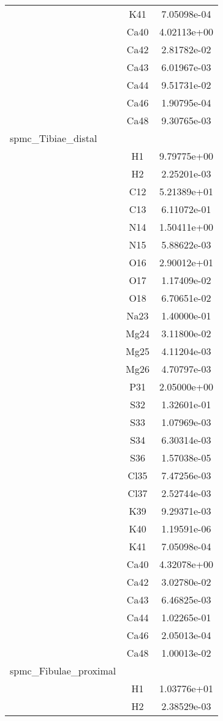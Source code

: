 \begin{centering}
\begin{longtable}{l c c}
& K41 & 7.05098e-04 \\ 
& Ca40 & 4.02113e+00 \\ 
& Ca42 & 2.81782e-02 \\ 
& Ca43 & 6.01967e-03 \\ 
& Ca44 & 9.51731e-02 \\ 
& Ca46 & 1.90795e-04 \\ 
& Ca48 & 9.30765e-03 \\ 
\hline
spmc_Tibiae_distal & & \\
\hline
& H1 & 9.79775e+00 \\ 
& H2 & 2.25201e-03 \\ 
& C12 & 5.21389e+01 \\ 
& C13 & 6.11072e-01 \\ 
& N14 & 1.50411e+00 \\ 
& N15 & 5.88622e-03 \\ 
& O16 & 2.90012e+01 \\ 
& O17 & 1.17409e-02 \\ 
& O18 & 6.70651e-02 \\ 
& Na23 & 1.40000e-01 \\ 
& Mg24 & 3.11800e-02 \\ 
& Mg25 & 4.11204e-03 \\ 
& Mg26 & 4.70797e-03 \\ 
& P31 & 2.05000e+00 \\ 
& S32 & 1.32601e-01 \\ 
& S33 & 1.07969e-03 \\ 
& S34 & 6.30314e-03 \\ 
& S36 & 1.57038e-05 \\ 
& Cl35 & 7.47256e-03 \\ 
& Cl37 & 2.52744e-03 \\ 
& K39 & 9.29371e-03 \\ 
& K40 & 1.19591e-06 \\ 
& K41 & 7.05098e-04 \\ 
& Ca40 & 4.32078e+00 \\ 
& Ca42 & 3.02780e-02 \\ 
& Ca43 & 6.46825e-03 \\ 
& Ca44 & 1.02265e-01 \\ 
& Ca46 & 2.05013e-04 \\ 
& Ca48 & 1.00013e-02 \\ 
\hline
spmc_Fibulae_proximal & & \\
\hline
& H1 & 1.03776e+01 \\ 
& H2 & 2.38529e-03 \\ 

\end{longtable}
\end{centering}
